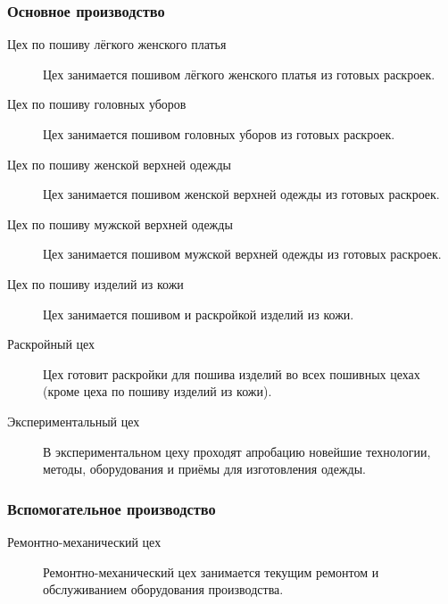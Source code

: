 \subsubsection{Основное производство}
\begin{description}
\item [Цех по пошиву лёгкого женского платья]
  Цех занимается пошивом лёгкого женского платья из готовых раскроек.
\item [Цех по пошиву головных уборов]
  Цех занимается пошивом головных уборов из готовых раскроек.
\item [Цех по пошиву женской верхней одежды]
  Цех занимается пошивом женской верхней одежды из готовых раскроек.
\item [Цех по пошиву мужской верхней одежды]
  Цех занимается пошивом мужской верхней одежды из готовых раскроек.
\item [Цех по пошиву изделий из кожи]
  Цех занимается пошивом и раскройкой изделий из кожи.
\item [Раскройный цех]
  Цех готовит раскройки для пошива изделий во всех пошивных цехах (кроме цеха по пошиву изделий из кожи).
\item [Экспериментальный цех]
  В экспериментальном цеху проходят апробацию новейшие технологии, методы, оборудования и приёмы для изготовления одежды.
\end{description}
\subsubsection{Вспомогательное производство}
\begin{description}
\item [Ремонтно-механический цех]
  Ремонтно-механический цех занимается текущим ремонтом и обслуживанием оборудования производства.
\end{description}